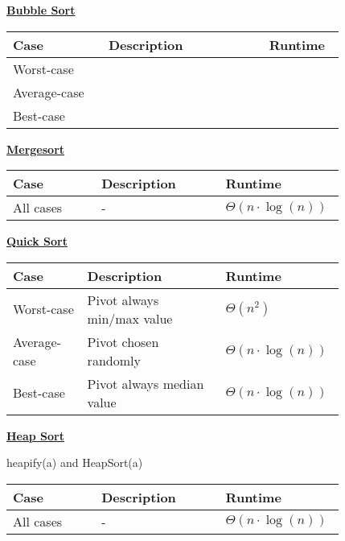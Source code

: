         {\centering\underline{\textbf{Bubble Sort}} \par}
        \begin{tabular*}{\linewidth}{| p{0.25\linewidth} | p{0.42\linewidth} | p{0.15\linewidth} |}
            \hline
            Case & Description & Runtime\\
            \hline \hline
            Worst-case &  &  \\
            \hline
            Average-case &  &  \\
            \hline
            Best-case &  &  \\
            \hline
        \end{tabular*}

        {\centering\underline{\textbf{Mergesort}} \par}
        \begin{tabular*}{\linewidth}{| p{0.25\linewidth} | p{0.35\linewidth} | p{0.22\linewidth} |}
            \hline
            Case & Description & Runtime\\
            \hline \hline
            All cases & - & $\Theta (n \cdot \log(n))$ \\
            \hline
        \end{tabular*}

        {\centering\underline{\textbf{Quick Sort}} \par}
        \begin{tabular*}{\linewidth}{| p{0.21\linewidth} | p{0.39\linewidth} | p{0.22\linewidth} |}
            \hline
            Case & Description & Runtime\\
            \hline \hline
            Worst-case & Pivot always min/max value & $\Theta(n^2)$ \\
            \hline
            Average-case & Pivot chosen randomly & $\Theta(n \cdot \log(n))$ \\
            \hline
            Best-case & Pivot always median value & $\Theta(n \cdot \log(n))$ \\
            \hline
        \end{tabular*}

        {\centering\underline{\textbf{Heap Sort}} \par}
        heapify(a) and HeapSort(a)\\
        \begin{tabular*}{\linewidth}{| p{0.25\linewidth} | p{0.35\linewidth} | p{0.22\linewidth} |}
            \hline
            Case & Description & Runtime\\
            \hline \hline
            All cases & - & $\Theta (n \cdot \log(n))$ \\
            \hline
        \end{tabular*}


